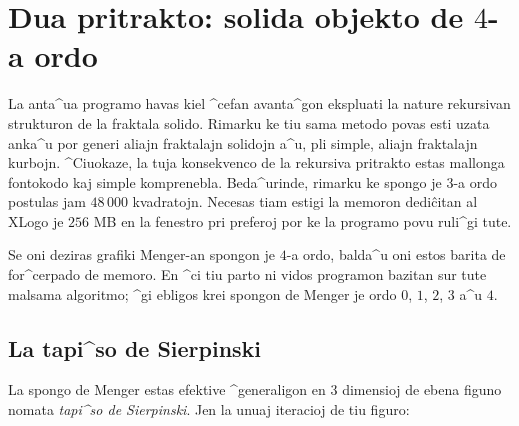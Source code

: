 \section{Dua pritrakto: solida objekto de $4$-a ordo}

La anta^ua programo havas kiel ^cefan avanta^gon ekspluati la nature
rekursivan strukturon de la fraktala solido.  Rimarku ke tiu sama
metodo povas esti uzata anka^u por generi aliajn fraktalajn solidojn
a^u, pli simple, aliajn fraktalajn kurbojn.  ^Ciuokaze, la tuja
konsekvenco de la rekursiva pritrakto estas mallonga fontokodo kaj
simple komprenebla.  Beda^urinde, rimarku ke spongo je $3$-a ordo
postulas jam $48\,000$ kvadratojn.  Necesas tiam estigi la memoron
dediĉitan al XLogo je $256$ MB en la fenestro pri preferoj por ke la
programo povu ruli^gi tute.

Se oni deziras grafiki Menger-an spongon je $4$-a ordo, balda^u oni
estos barita de for^cerpado de memoro.  En ^ci tiu parto ni vidos
programon bazitan sur tute malsama algoritmo; ^gi ebligos krei spongon
de Menger je ordo $0$, $1$, $2$, $3$ a^u $4$.

\subsection{La tapi^so de Sierpinski}

La spongo de Menger estas efektive ^generaligon en $3$ dimensioj de
ebena figuno nomata \emph{tapi^so de Sierpinski}.  Jen la unuaj
iteracioj de tiu figuro:

